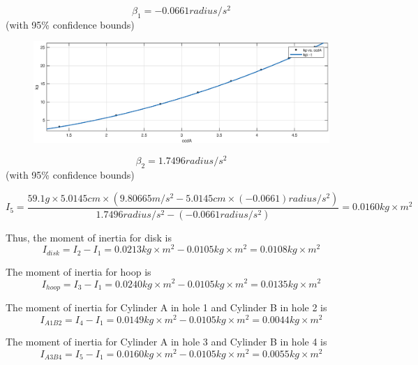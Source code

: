 $$ \beta_1 = -0.0661 radius/s^2$$ (with 95\% confidence bounds) 

\begin{figure}[H]
\centering
\includegraphics[width=\EFWwr]{matlab/ccda}
\end{figure}

$$ \beta_2 = 1.7496 radius/s^2$$ (with 95\% confidence bounds) 


$$ I_5 = \frac{59.1 g \times 5.0145 cm \times (9.80665 m/s^2 - 5.0145 cm \times (-0.0661) radius/s^2 )}{ 1.7496 radius/s^2 -(-0.0661 radius/s^2) } = 0.0160 kg\times m^2 $$

Thus, the moment of inertia for disk is 
$$ I_{disk} = I_2 - I_1 = 0.0213  kg\times m^2 - 0.0105 kg\times m^2 =  0.0108  kg\times m^2 $$

The moment of inertia for hoop is 
$$ I_{hoop} = I_3 - I_1 = 0.0240  kg\times m^2 - 0.0105 kg\times m^2 =  0.0135  kg\times m^2 $$

The moment of inertia for Cylinder A in hole 1 and Cylinder B in hole 2 is 
$$ I_{A1B2} = I_4 - I_1 = 0.0149  kg\times m^2 - 0.0105 kg\times m^2 =  0.0044  kg\times m^2 $$

The moment of inertia for Cylinder A in hole 3 and Cylinder B in hole 4 is 
$$ I_{A3B4} = I_5 - I_1 = 0.0160  kg\times m^2 - 0.0105 kg\times m^2 =  0.0055  kg\times m^2 $$

